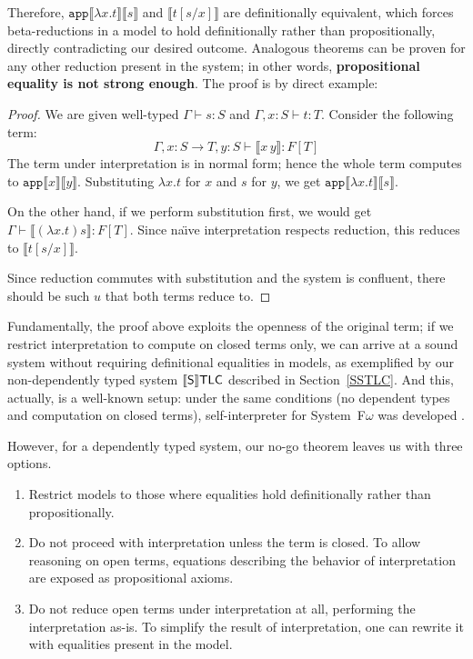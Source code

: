 Therefore, $\mathtt{app}\llbracket\lambda x.t\rrbracket
\llbracket s \rrbracket$ and $\llbracket t[s/x]
\rrbracket$ are definitionally equivalent, which forces
beta-reductions in a model to hold definitionally rather
than propositionally, directly contradicting our desired
outcome. Analogous theorems can be proven for any other
reduction present in the system; in other words,
\textbf{propositional equality is not strong enough}.
The proof is by direct example:

\begin{proof}
    We are given well-typed $\Gamma\vdash s:S$ and
    $\Gamma,x:S\vdash t:T$. Consider the following term:
    \[
        \Gamma,x:S\to T,y:S\vdash
            \llbracket x\,y\rrbracket:F[T]
    \]
    The term under interpretation is in normal form; hence
    the whole term computes to $\mathtt{app}\llbracket x
    \rrbracket\llbracket y\rrbracket$.
    Substituting $\lambda x.t$ for $x$ and $s$ for $y$,
    we get $\mathtt{app}\llbracket\lambda x.t\rrbracket
    \llbracket s \rrbracket$.

    On the other hand, if we perform substitution first,
    we would get $\Gamma\vdash\llbracket(\lambda x.t)s
    \rrbracket:F[T]$. Since na\"{\i}ve interpretation
    respects reduction, this reduces to
    $\llbracket t[s/x] \rrbracket$.

    Since reduction commutes with substitution and
    the system is confluent, there should be such $u$ that
    both terms reduce to.
\end{proof}

Fundamentally, the proof above exploits the openness of
the original term; if we restrict interpretation to
compute on closed terms only, we can arrive at a sound
system without requiring definitional equalities in
models, as exemplified by our non-dependently typed
system $\llbracket\mathsf{S}\rrbracket\mathsf{TLC}$ described in Section~\ref{SSTLC}. And
this, actually, is a well-known setup: under the same
conditions (no dependent types and computation on closed
terms), self-interpreter for System~F$\omega$ was
developed \cite{brown2016breaking}.

However, for a dependently typed system, our no-go
theorem leaves us with three options.

\begin{enumerate}
    \item Restrict models to those where equalities hold
        definitionally rather than propositionally.
    \item Do not proceed with interpretation unless
        the term is closed. To allow reasoning on open
        terms, equations describing the behavior of
        interpretation are exposed as propositional
        axioms.
    \item Do not reduce open terms under
        interpretation at all, performing the
        interpretation as-is. To simplify the result
        of interpretation, one can rewrite it with
        equalities present in the model.
\end{enumerate}

